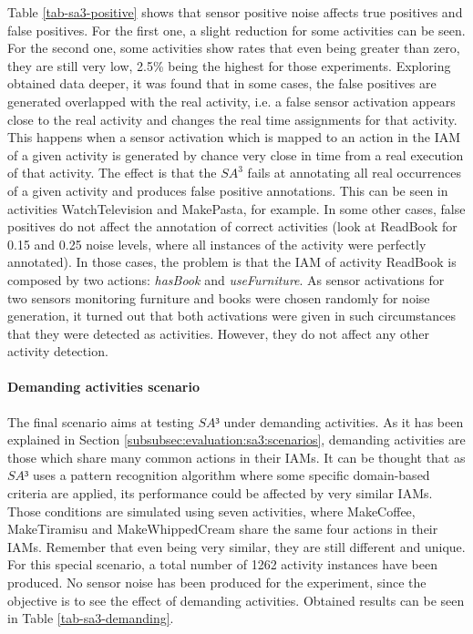 Table \ref{tab-sa3-positive} shows that sensor positive noise affects true positives and false positives. For the first one, a slight reduction for some activities can be seen. For the second one, some activities show rates that even being greater than zero, they are still very low, 2.5\% being the highest for those experiments. Exploring obtained data deeper, it was found that in some cases, the false positives are generated overlapped with the real activity, i.e. a false sensor activation appears close to the real activity and changes the real time assignments for that activity. This happens when a sensor activation which is mapped to an action in the IAM of a given activity is generated by chance very close in time from a real execution of that activity. The effect is that the $SA^3$ fails at annotating all real occurrences of a given activity and produces false positive annotations. This can be seen in activities WatchTelevision and MakePasta, for example. In some other cases, false positives do not affect the annotation of correct activities (look at ReadBook for 0.15 and 0.25 noise levels, where all instances of the activity were perfectly annotated). In those cases, the problem is that the IAM of activity ReadBook is composed by two actions: \textit{hasBook} and \textit{useFurniture}. As sensor activations for two sensors monitoring furniture and books were chosen randomly for noise generation, it turned out that both activations were given in such circumstances that they were detected as activities. However, they do not affect any other activity detection.

\paragraph*{Demanding activities scenario}

The final scenario aims at testing $SA³$ under demanding activities. As it has been explained in Section \ref{subsubsec:evaluation:sa3:scenarios}, demanding activities are those which share many common actions in their IAMs. It can be thought that as $SA³$ uses a pattern recognition algorithm where some specific domain-based criteria are applied, its performance could be affected by very similar IAMs. Those conditions are simulated using seven activities, where MakeCoffee, MakeTiramisu and MakeWhippedCream share the same four actions in their IAMs. Remember that even being very similar, they are still different and unique. For this special scenario, a total number of 1262 activity instances have been produced. No sensor noise has been produced for the experiment, since the objective is to see the effect of demanding activities. Obtained results can be seen in Table \ref{tab-sa3-demanding}.


